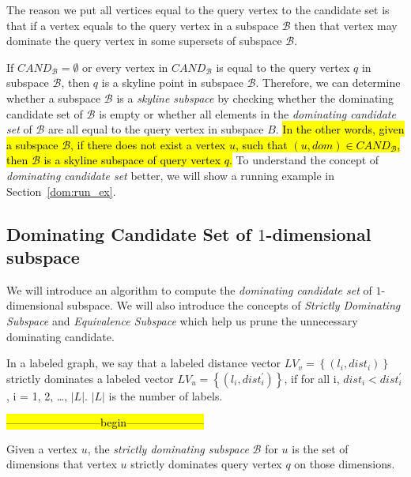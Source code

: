 The reason we put all vertices equal to the query vertex to the candidate set is that if a vertex equals to the query vertex in a subspace $\mathcal{B}$ then that vertex may dominate the query vertex in some supersets of subspace $\mathcal{B}$. 

If $\mathit{CAND}_\mathcal{B} = \emptyset$ or every vertex in $\mathit{CAND}_\mathcal{B}$ is equal to the query vertex $q$ in subspace $\mathcal{B}$, then $q$ is a skyline point in subspace $\mathcal{B}$. Therefore, we can determine whether a subspace $\mathcal{B}$ is a \emph{skyline subspace} by checking whether the dominating candidate set of $\mathcal{B}$ is empty or whether all elements in the \emph{dominating candidate set} of $\mathcal{B}$ are all equal to the query vertex in subspace $B$. \hl{In the other words, given a subspace $\mathcal{B}$, if there does not exist a vertex $u$, such that $(u, dom) \in \mathit{CAND}_\mathcal{B}$, then $\mathcal{B}$ is a skyline subspace of query vertex $q$.} To understand the concept of \emph{dominating candidate set} better, we will show a running example in Section~\ref{dom:run_ex}.

\subsection{Dominating Candidate Set of $1$-dimensional subspace}

We will introduce an algorithm to compute the \emph{dominating candidate set} of $1$-dimensional subspace. We will also introduce the concepts of \emph{Strictly Dominating Subspace} and \emph{Equivalence Subspace} which help us prune the unnecessary dominating candidate.

\begin{definition}
In a labeled graph, we say that a labeled distance vector $LV_v=\left\{(l_i, dist_i)\right\}$ strictly dominates a labeled vector $LV_u=\left\{(l_i, dist_i^\prime)\right\}$, if for all i, $dist_i < dist_i^\prime$, i = 1, 2, \dots, $|L|$. $|L|$ is the number of labels.
\end{definition}

\hl{--------------------------begin---------------------}
\begin{definition}
Given a vertex $u$, the \emph{strictly dominating subspace} $\mathcal{B}$ for $u$ is the set of dimensions that vertex $u$ strictly dominates query vertex $q$ on those dimensions.
\end{definition}


